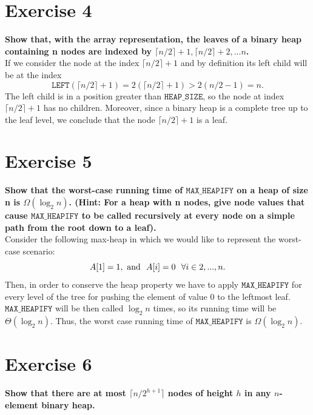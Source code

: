 \documentclass{article}
\begin{document}
	\section*{Exercise 4}
	\textbf{Show that, with the array representation, the leaves of a
	binary heap containing n nodes are indexed by $\lceil n/2 \rceil + 1, \lceil n/2 \rceil + 2, . . . n$.} \\



	\noindent If we consider the node at the index $ \lceil n/2 \rceil +1$ and by definition its left child will be at the index 
	$$ 
	\mathtt{LEFT}( \lceil n/2 \rceil +1 ) = 2(\lceil n/2 \rceil +1) > 2(n/2 - 1) = n.
	$$
	The left child is in a position greater than $\mathtt{HEAP\_SIZE}$, so the node at index $\lceil n/2 \rceil + 1$ has no children. Moreover, since a binary heap is a complete tree up to the leaf level, we conclude that the node $ \lceil n/2 \rceil +1$ is a leaf.
	
	\section*{Exercise 5}
	\textbf{Show that the worst-case running time of $\mathtt{MAX\_HEAPIFY}$ on a heap of size n is $\Omega(\log_2 n)$.  (Hint: For a heap with n nodes, give node values that cause $\mathtt{MAX\_HEAPIFY}$ to be called recursively at every node on a simple path from the root down to a leaf).} \\
	
	\noindent Consider the following max-heap in which we would like to represent the worst-case scenario:
	$$
	A[1] = 1, ~ \textmd{and} ~~ A[i] = 0 ~~ \forall i \in {2,..., n}.
	$$
	Then, in order to conserve the heap property we have to apply $\mathtt{MAX\_HEAPIFY}$ for every level of the tree  for pushing the element of value 0 to the leftmost leaf. $\mathtt{MAX\_HEAPIFY}$ will be then called $\log_2n$ times, so its running time will be $\Theta (\log_2n)$. Thus, the worst case running time of $\mathtt{MAX\_HEAPIFY}$ is $\Omega(\log_2n)$.
	
	\section*{Exercise 6}
	\textbf{Show that there are at most $\lceil n/2^{h+1} \rceil$ nodes of height $h$ in any $n$-element binary heap.} \\
	
\end{document}
